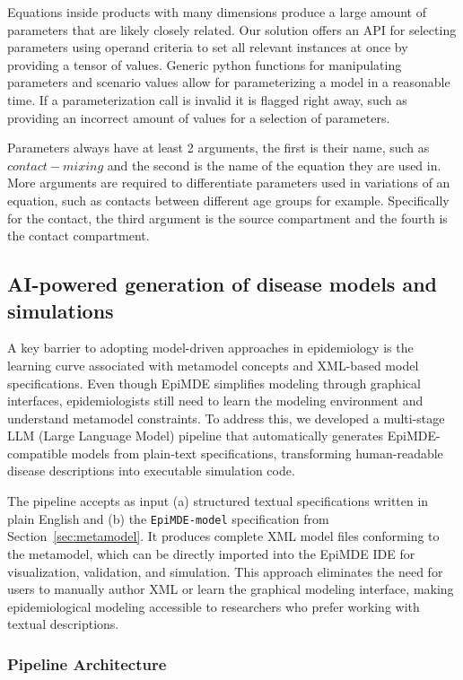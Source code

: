 Equations inside products with many dimensions produce a large amount of parameters that are likely closely related. Our solution offers an API for selecting parameters using operand criteria to set all relevant instances at once by providing a tensor of values. Generic python functions for manipulating parameters and scenario values allow for parameterizing a model in a reasonable time. If a parameterization call is invalid it is flagged right away, such as providing an incorrect amount of values for a selection of parameters.

Parameters always have at least 2 arguments, the first is their name, such as $contact-mixing$ and the second is the name of the equation they are used in. More arguments are required to differentiate parameters used in variations of an equation, such as contacts between different age groups for example. Specifically for the contact, the third argument is the source compartment and the fourth is the contact compartment.

\subsection{AI-powered generation of disease models and simulations}

A key barrier to adopting model-driven approaches in epidemiology is the learning curve associated with metamodel concepts and XML-based model specifications. Even though EpiMDE simplifies modeling through graphical interfaces, epidemiologists still need to learn the modeling environment and understand metamodel constraints. To address this, we developed a multi-stage LLM (Large Language Model) pipeline that automatically generates EpiMDE-compatible models from plain-text specifications, transforming human-readable disease descriptions into executable simulation code.

The pipeline accepts as input (a) structured textual specifications written in plain English and (b) the \texttt{EpiMDE-model} specification from Section~\ref{sec:metamodel}. It produces complete XML model files conforming to the metamodel, which can be directly imported into the EpiMDE IDE for visualization, validation, and simulation. This approach eliminates the need for users to manually author XML or learn the graphical modeling interface, making epidemiological modeling accessible to researchers who prefer working with textual descriptions.

\subsubsection{Pipeline Architecture}

